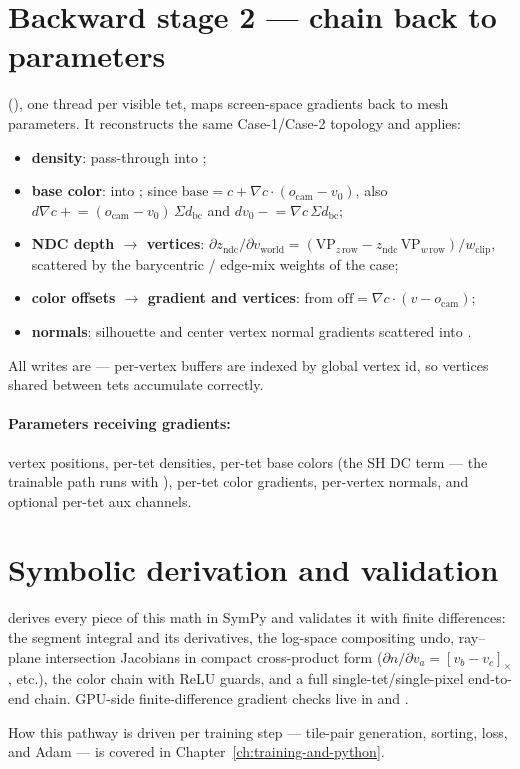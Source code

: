 \section{Backward stage 2 --- chain back to parameters}

 (), one
thread per visible tet, maps screen-space gradients back to mesh parameters.
It reconstructs the same Case-1/Case-2 topology and applies:

\begin{itemize}
\item \textbf{density}: pass-through into ;
\item \textbf{base color}: into ; since
  $\text{base} = c + \nabla c \cdot (o_{\text{cam}} - v_0)$, also
  $d\nabla c \mathrel{+}= (o_{\text{cam}} - v_0)\, \Sigma d_{\text{bc}}$ and
  $d v_0 \mathrel{-}= \nabla c\, \Sigma d_{\text{bc}}$;
\item \textbf{NDC depth $\to$ vertices}:
  $\partial z_{\text{ndc}} / \partial v_{\text{world}} =
  (\text{VP}_{z\,\text{row}} - z_{\text{ndc}}\,\text{VP}_{w\,\text{row}}) /
  w_{\text{clip}}$, scattered by the barycentric / edge-mix weights of the
  case;
\item \textbf{color offsets $\to$ gradient and vertices}: from
  $\text{off} = \nabla c \cdot (v - o_{\text{cam}})$;
\item \textbf{normals}: silhouette and center vertex normal gradients
  scattered into .
\end{itemize}

All writes are  --- per-vertex buffers are indexed by global
vertex id, so vertices shared between tets accumulate correctly.

\paragraph{Parameters receiving gradients:} vertex positions, per-tet
densities, per-tet base colors (the SH DC term --- the trainable path runs
with ), per-tet color gradients, per-vertex normals, and
optional per-tet aux channels.

\section{Symbolic derivation and validation}

 derives every piece of this math in SymPy
and validates it with finite differences: the segment integral and its
derivatives, the log-space compositing undo, ray--plane intersection
Jacobians in compact cross-product form
($\partial n / \partial v_a = [v_b - v_c]_\times$, etc.), the color chain
with ReLU guards, and a full single-tet/single-pixel end-to-end chain.
GPU-side finite-difference gradient checks live in
 and
.

How this pathway is driven per training step --- tile-pair generation,
sorting, loss, and Adam --- is covered in Chapter~\ref{ch:training-and-python}.

